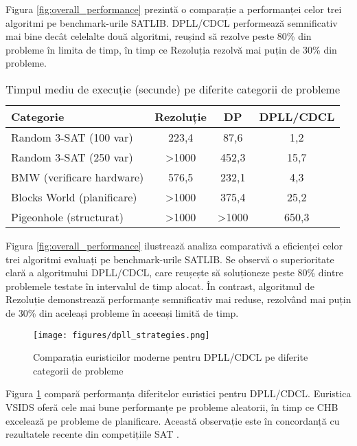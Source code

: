 \documentclass[a4paper,10pt]{article}
\begin{document}
Figura \ref{fig:overall_performance} prezintă o comparație a performanței celor trei algoritmi pe benchmark-urile SATLIB. DPLL/CDCL performează semnificativ mai bine decât celelalte două algoritmi, reușind să rezolve peste 80\% din probleme în limita de timp, în timp ce Rezoluția rezolvă mai puțin de 30\% din probleme.

\begin{table}[h]
    \centering
    \caption{Timpul mediu de execuție (secunde) pe diferite categorii de probleme}
    \label{tab:avg_performance}
    \begin{tabular}{lccc}
        \toprule
        Categorie & Rezoluție & DP & DPLL/CDCL \\
        \midrule
        Random 3-SAT (100 var) & 223,4 & 87,6 & 1,2 \\
        Random 3-SAT (250 var) & >1000 & 452,3 & 15,7 \\
        BMW (verificare hardware) & 576,5 & 232,1 & 4,3 \\
        Blocks World (planificare) & >1000 & 375,4 & 25,2 \\
        Pigeonhole (structurat) & >1000 & >1000 & 650,3 \\
        \bottomrule
    \end{tabular}
\end{table}

Figura \ref{fig:overall_performance} ilustrează analiza comparativă a eficienței celor trei algoritmi evaluați pe benchmark-urile SATLIB. Se observă o superioritate clară a algoritmului DPLL/CDCL, care reușește să soluționeze peste 80\% dintre problemele testate în intervalul de timp alocat. În contrast, algoritmul de Rezoluție demonstrează performanțe semnificativ mai reduse, rezolvând mai puțin de 30\% din aceleași probleme în aceeași limită de timp.

\begin{figure}[h]
    \centering
    \texttt{[image: figures/dpll\_strategies.png]}
    \caption{Comparația euristicilor moderne pentru DPLL/CDCL pe diferite categorii de probleme}
    \label{fig:dpll_strategies}
\end{figure}

Figura \ref{fig:dpll_strategies} compară performanța diferitelor euristici pentru DPLL/CDCL. Euristica VSIDS oferă cele mai bune performanțe pe probleme aleatorii, în timp ce CHB excelează pe probleme de planificare. Această observație este în concordanță cu rezultatele recente din competițiile SAT \cite{Marques-Silva2021}.
\end{document}
